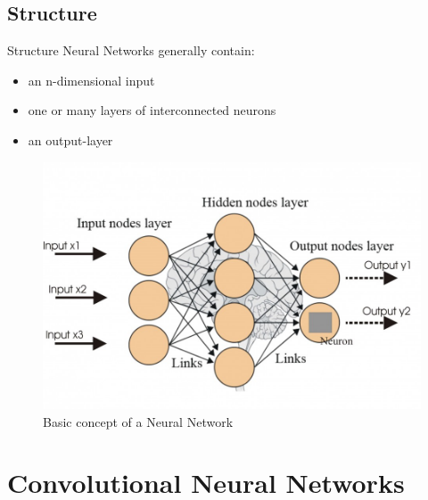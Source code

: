 \documentclass[12pt]{beamer}
\begin{document}
\subsection{Structure}
\begin{frame}{Structure}
Neural Networks generally contain:
  \begin{itemize}
     \item an n-dimensional input 
     \item one or many layers of interconnected neurons
     \item an output-layer
  \end{itemize}
\begin{figure}
\centering
\includegraphics[width=0.5\linewidth]{images/principle.jpg}
\caption{Basic concept of a Neural Network}
\label{fig:principle}

\end{figure}

\end{frame}
\section{Convolutional Neural Networks}
\end{document}
